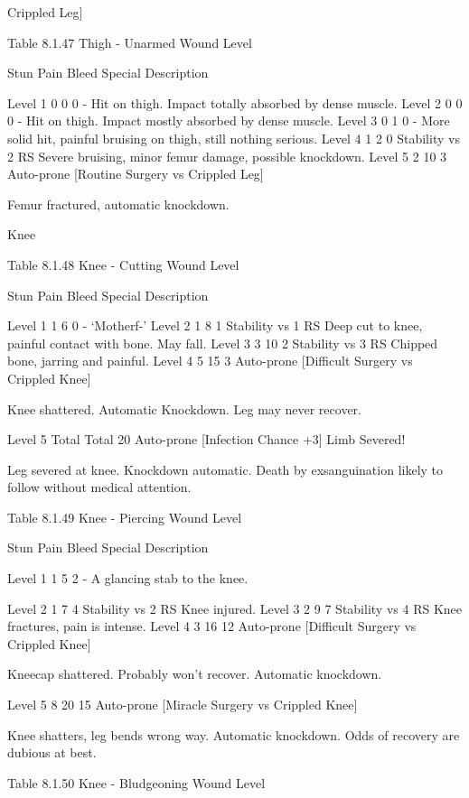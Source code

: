\documentclass[oneside,11pt,english]{book}
\begin{document}
Crippled Leg] 

 
Table 8.1.47 Thigh - Unarmed 
Wound 
Level 

Stun Pain Bleed Special Description 

Level 1 0 0 0 - Hit on thigh. Impact totally absorbed by dense 
muscle. 
Level 2 0 0 0 - Hit on thigh. Impact mostly absorbed by dense 
muscle. 
Level 3 0 1 0 - More solid hit, painful bruising on thigh, still 
nothing serious. 
Level 4 1 2 0 Stability vs 2 RS Severe bruising, minor femur damage, possible 
knockdown. 
Level 5 2 10 3 Auto-prone 
[Routine Surgery vs 
Crippled Leg] 

Femur fractured, automatic knockdown. 

 

 

Knee 

 

Table 8.1.48 Knee - Cutting 
Wound 
Level 

Stun Pain Bleed Special Description 

Level 1 1 6 0 - ‘Motherf-’ 
Level 2 1 8 1 Stability vs 1 RS Deep cut to knee, painful contact with bone. May fall. 
Level 3 3 10 2 Stability vs 3 RS Chipped bone, jarring and painful. 
Level 4 5 15 3 Auto-prone 
[Difficult Surgery vs 
Crippled Knee] 

Knee shattered. Automatic Knockdown. Leg may never 
recover. 

Level 5 Total Total 20 Auto-prone 
[Infection Chance 
+3] Limb Severed! 

 

Leg severed at knee. Knockdown automatic. Death by 
exsanguination likely to follow without medical 
attention. 

 
Table 8.1.49 Knee - Piercing 
Wound 
Level 

Stun Pain Bleed Special Description 

Level 1 1 5 2 - A glancing stab to the knee. 


Level 2 1 7 4 Stability vs 2 RS Knee injured. 
Level 3 2 9 7 Stability vs 4 RS Knee fractures, pain is intense. 
Level 4 3 16 12 Auto-prone 
[Difficult Surgery vs 
Crippled Knee] 

Kneecap shattered. Probably won't recover. 
Automatic knockdown. 

Level 5 8 20 15 Auto-prone 
[Miracle Surgery vs 
Crippled Knee] 

Knee shatters, leg bends wrong way. Automatic 
knockdown. Odds of recovery are dubious at best. 

 
Table 8.1.50 Knee - Bludgeoning 
Wound 
Level 
\end{document}
